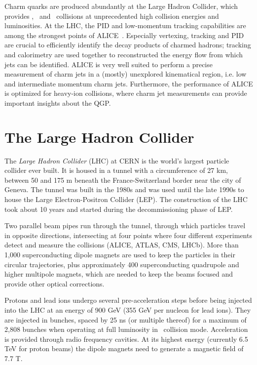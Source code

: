 \documentclass[12pt, a4paper, twoside, titlepage]{article}
\begin{document}
Charm quarks are produced abundantly at the Large Hadron Collider, which provides \pp, \pPb\ and \PbPb\ collisions at unprecedented high collision energies and luminosities.
At the LHC, the PID and low-momentum tracking capabilities are among the strongest points of ALICE~\cite{ALICE:2014b}.
Especially vertexing, tracking and PID are crucial to efficiently identify the decay products of charmed hadrons; tracking and calorimetry are used together to reconstructed the energy flow from which jets can be identified.
ALICE is very well suited to perform a precise measurement of charm jets in a (mostly) unexplored kinematical region, i.e. low and intermediate momentum charm jets. Furthermore, the performance of ALICE
is optimized for heavy-ion collisions, where charm jet measurements can provide important insights about the QGP.

\section{The Large Hadron Collider}
The \emph{Large Hadron Collider} (LHC) at CERN is the world's largest particle collider ever built.
It is housed in a tunnel with a circumference of 27 km, between 50 and 175 m beneath
the France-Switzerland border near the city of Geneva. The tunnel was built in the 1980s and was used until 
the late 1990s to house the Large Electron-Positron Collider (LEP). The construction of the LHC took about 10 years and started
during the decommissioning phase of LEP. 

Two parallel beam pipes run through the tunnel,
through which particles travel in opposite directions, intersecting at four points where four different experiments
detect and measure the collisions (\mbox{ALICE}, \mbox{ATLAS}, \mbox{CMS}, \mbox{LHCb}). More than 1,000 superconducting dipole magnets
are used to keep the particles in their circular trajectories, plus approximately 400 superconducting quadrupole and higher multipole
magnets, which are needed to keep the beams focused and provide other optical corrections.

Protons and lead ions undergo several pre-acceleration steps before being injected into the LHC at an energy of 900 GeV (355 GeV per nucleon for lead ions).
They are injected in bunches, spaced by 25 ns (or multiple thereof) for a maximum of 2,808 bunches when operating at full luminosity in \pp\ collision mode.
Acceleration is provided through radio frequency cavities. At its highest energy (currently 6.5 TeV for proton beams) the dipole magnets need to generate
a magnetic field of 7.7 T.
\end{document}
